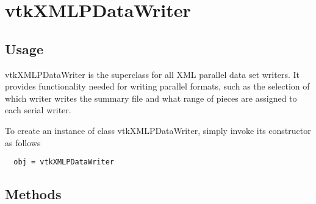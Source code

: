 \section{vtkXMLPDataWriter}

\subsection{Usage}

 vtkXMLPDataWriter is the superclass for all XML parallel data set
 writers.  It provides functionality needed for writing parallel
 formats, such as the selection of which writer writes the summary
 file and what range of pieces are assigned to each serial writer.

To create an instance of class vtkXMLPDataWriter, simply
invoke its constructor as follows
\begin{verbatim}
  obj = vtkXMLPDataWriter
\end{verbatim}
\subsection{Methods}

